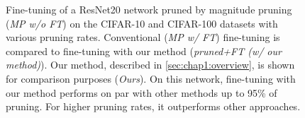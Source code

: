 \begin{figure}
  \centering
  \caption{ Fine-tuning of a ResNet20 network pruned by magnitude pruning
    (\emph{MP w/o FT}) on the CIFAR-10 and CIFAR-100 datasets with various pruning
    rates. Conventional (\emph{MP w/ FT}) fine-tuning is compared to fine-tuning
    with our method (\emph{pruned+FT (w/ our method)}). Our method, described in
    \cref{sec:chap1:overview}, is shown for comparison purposes (\emph{Ours}). On
    this network, fine-tuning with our method performs on par with other methods
    up to 95\% of pruning. For higher pruning rates, it outperforms other
    approaches.}
  \label{fig:chap1:finetuning_impact_vgg6}
\end{figure}



